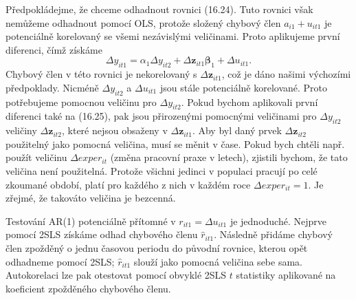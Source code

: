 Předpokládejme, že chceme odhadnout rovnici (16.24). Tuto rovnici však nemůžeme odhadnout pomocí OLS, protože složený chybový člen $a_{i1} + u_{it1}$ je potenciálně korelovaný se všemi nezávislými veličinami. Proto aplikujeme první diferenci, čímž získáme
\begin{equation}
\Delta y_{it1} = \alpha_1 \Delta y_{it2} + \Delta \pmb{z}_{it1} \pmb{\beta}_1 + \Delta u_{it1}.
\end{equation}
Chybový člen v této rovnici je nekorelovaný s $\Delta \pmb{z}_{it1}$, což je dáno našimi výchozími předpoklady. Nicméně $\Delta y_{it2}$ a $\Delta u_{it1}$ jsou stále potenciálně korelované. Proto potřebujeme pomocnou veličinu pro $\Delta y_{it2}$. Pokud bychom aplikovali první diferenci také na (16.25), pak jsou přirozenými pomocnými veličinami pro $\Delta y_{it2}$ veličiny $\Delta \pmb{z}_{it2}$, které nejsou obsaženy v $\Delta \pmb{z}_{it1}$. Aby byl daný prvek $\Delta \pmb{z}_{it2}$ použitelný jako pomocná veličina, musí se měnit v čase. Pokud bych chtěli např. použít veličinu $\Delta exper_{it}$ (změna pracovní praxe v letech), zjistili bychom, že tato veličina není použitelná. Protože všichni jedinci v populaci pracují po celé zkoumané období, platí pro každého z nich v každém roce $\Delta exper_{it} = 1$. Je zřejmé, že takováto veličina je bezcenná.

Testování AR(1) potenciálně přítomné v $r_{it1} = \Delta u_{it1}$ je jednoduché. Nejprve pomocí 2SLS získáme odhad chybového členu $\hat{r}_{it1}$. Následně přidáme chybový člen zpožděný o jednu časovou periodu do původní rovnice, kterou opět odhadneme pomocí 2SLS; $\hat{r}_{it1}$ slouží jako pomocná veličina sebe sama. Autokorelaci lze pak otestovat pomocí obvyklé 2SLS $t$ statistiky aplikované na koeficient zpožděného chybového členu.
